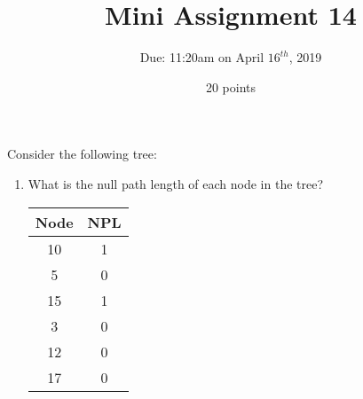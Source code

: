 \documentclass[12pt]{article}
\begin{document}
 
\title{Mini Assignment 14}
\author{Due: 11:20am on April $16^{th}$, 2019}
\date{20 points}
\maketitle

Consider the following tree:


\begin{enumerate}
	\item What is the null path length of each node in the tree? 
	
	\begin{center}
		\begin{tabular}{c|c}
			Node & NPL \\
			\hline
			10 & 1 \\
			5 & 0 \\
			15 & 1 \\
			3 & 0 \\
			12 & 0 \\
			17 & 0
		\end{tabular}
	\end{center}
	
\end{enumerate}
\end{document}

